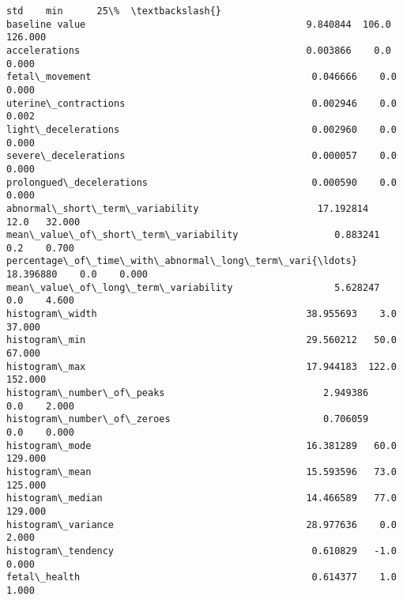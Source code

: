 \documentclass[11pt]{article}
\begin{document}
\begin{tcolorbox}[breakable, size=fbox, boxrule=.5pt, pad at break*=1mm, opacityfill=0]
\begin{Verbatim}[commandchars=\\\{\}]
                                                          std    min      25\%  \textbackslash{}
baseline value                                       9.840844  106.0  126.000
accelerations                                        0.003866    0.0    0.000
fetal\_movement                                       0.046666    0.0    0.000
uterine\_contractions                                 0.002946    0.0    0.002
light\_decelerations                                  0.002960    0.0    0.000
severe\_decelerations                                 0.000057    0.0    0.000
prolongued\_decelerations                             0.000590    0.0    0.000
abnormal\_short\_term\_variability                     17.192814   12.0   32.000
mean\_value\_of\_short\_term\_variability                 0.883241    0.2    0.700
percentage\_of\_time\_with\_abnormal\_long\_term\_vari{\ldots}  18.396880    0.0    0.000
mean\_value\_of\_long\_term\_variability                  5.628247    0.0    4.600
histogram\_width                                     38.955693    3.0   37.000
histogram\_min                                       29.560212   50.0   67.000
histogram\_max                                       17.944183  122.0  152.000
histogram\_number\_of\_peaks                            2.949386    0.0    2.000
histogram\_number\_of\_zeroes                           0.706059    0.0    0.000
histogram\_mode                                      16.381289   60.0  129.000
histogram\_mean                                      15.593596   73.0  125.000
histogram\_median                                    14.466589   77.0  129.000
histogram\_variance                                  28.977636    0.0    2.000
histogram\_tendency                                   0.610829   -1.0    0.000
fetal\_health                                         0.614377    1.0    1.000


\end{Verbatim}
\end{tcolorbox}
\end{document}
